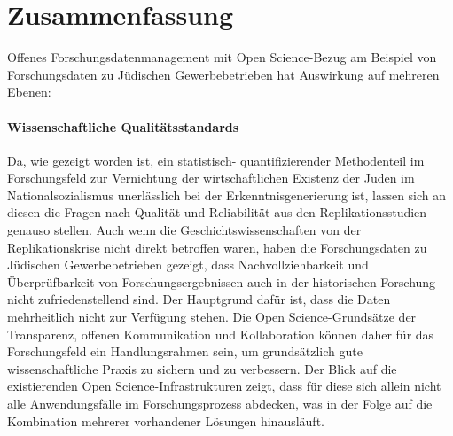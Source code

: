 \onehalfspacing

\section{Zusammenfassung}

Offenes Forschungsdatenmanagement mit Open Science-Bezug am Beispiel von Forschungsdaten zu Jüdischen Gewerbebetrieben hat Auswirkung auf mehreren Ebenen:

\paragraph{Wissenschaftliche Qualitätsstandards} Da, wie gezeigt worden ist, ein statistisch- quantifizierender Methodenteil im Forschungsfeld zur Vernichtung der wirtschaftlichen Existenz der Juden im Nationalsozialismus unerlässlich bei der Erkenntnisgenerierung ist, lassen sich an diesen die Fragen nach Qualität und Reliabilität aus den Replikationsstudien genauso stellen. Auch wenn die Geschichtswissenschaften von der Replikationskrise nicht direkt betroffen waren, haben die Forschungsdaten zu Jüdischen Gewerbebetrieben gezeigt, dass Nachvollziehbarkeit und Überprüfbarkeit von Forschungsergebnissen auch in der historischen Forschung nicht zufriedenstellend sind. Der Hauptgrund dafür ist, dass die Daten mehrheitlich nicht zur Verfügung stehen. Die Open Science-Grundsätze der Transparenz, offenen Kommunikation und Kollaboration können daher für das Forschungsfeld ein Handlungsrahmen sein, um grundsätzlich gute wissenschaftliche Praxis zu sichern und zu verbessern. Der Blick auf die existierenden Open Science-Infrastrukturen zeigt, dass für diese sich allein nicht alle Anwendungsfälle im Forschungsprozess abdecken, was in der Folge auf die Kombination mehrerer vorhandener Lösungen hinausläuft.

